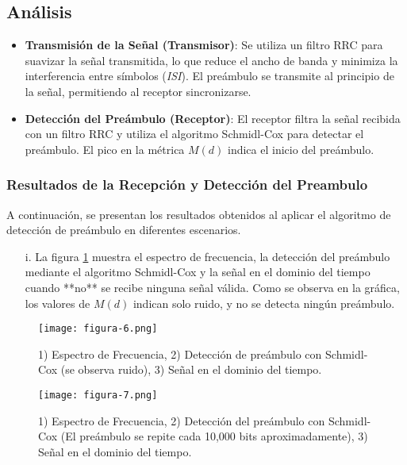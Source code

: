 \documentclass[letterpaper,12pt,oneside]{article}
\begin{document}
\subsection{Análisis}
\begin{itemize}
    \item \textbf{Transmisión de la Señal (Transmisor)}: Se utiliza un filtro RRC para suavizar la señal transmitida, lo que reduce el ancho de banda y minimiza la interferencia entre símbolos (\textit{ISI}). El preámbulo se transmite al principio de la señal, permitiendo al receptor sincronizarse.
    \item \textbf{Detección del Preámbulo (Receptor)}: El receptor filtra la señal recibida con un filtro RRC y utiliza el algoritmo Schmidl-Cox para detectar el preámbulo. El pico en la métrica \(M(d)\) indica el inicio del preámbulo.
\end{itemize}


\subsubsection{Resultados de la Recepción y Detección del Preambulo}
A continuación, se presentan los resultados obtenidos al aplicar el algoritmo de detección de preámbulo en diferentes escenarios.

\begin{itemize}
    \item[i.] La figura \ref{fig:detec_ruido} muestra el espectro de frecuencia, la detección del preámbulo mediante el algoritmo Schmidl-Cox y la señal en el dominio del tiempo cuando **no** se recibe ninguna señal válida. Como se observa en la gráfica, los valores de \(M(d)\) indican solo ruido, y no se detecta ningún preámbulo.
\end{itemize}

\begin{figure}[H]
    \centering
    \texttt{[image: figura-6.png]}
    \caption{1) Espectro de Frecuencia, 2) Detección de preámbulo con Schmidl-Cox (se observa ruido), 3) Señal en el dominio del tiempo.}
    \label{fig:detec_ruido}
\end{figure}

\begin{figure}[H]
    \centering
    \texttt{[image: figura-7.png]}
    \caption{1) Espectro de Frecuencia, 2) Detección del preámbulo con Schmidl-Cox (El preámbulo se repite cada 10,000 bits aproximadamente), 3) Señal en el dominio del tiempo.}
    \label{fig:detec_preambulo}
\end{figure}
\end{document}
